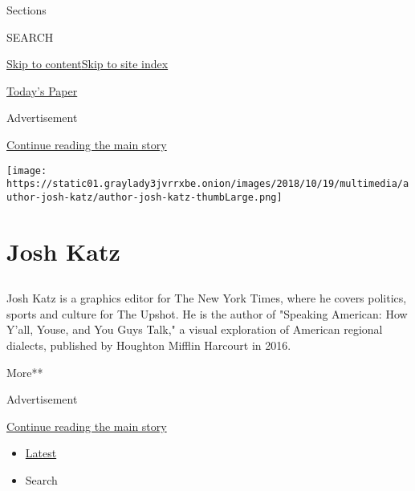 Sections

SEARCH

\protect\hyperlink{site-content}{Skip to
content}\protect\hyperlink{site-index}{Skip to site index}

\href{https://myaccount.nytimes3xbfgragh.onion/auth/login?response_type=cookie\&client_id=vi}{}

\href{https://www.nytimes3xbfgragh.onion/section/todayspaper}{Today's
Paper}

Advertisement

\protect\hyperlink{after-top}{Continue reading the main story}

\texttt{[image: https://static01.graylady3jvrrxbe.onion/images/2018/10/19/multimedia/author-josh-katz/author-josh-katz-thumbLarge.png]}

\hypertarget{josh-katz}{%
\section{Josh Katz}\label{josh-katz}}

\subsection{}

Josh Katz is a graphics editor for The New York Times, where he covers
politics, sports and culture for The Upshot. He is the author of
"Speaking American: How Y'all, Youse, and You Guys Talk," a visual
exploration of American regional dialects, published by Houghton Mifflin
Harcourt in 2016.

More**

Advertisement

\protect\hyperlink{after-mid1}{Continue reading the main story}

\begin{itemize}
\tightlist
\item
  \protect\hyperlink{stream-panel}{Latest}
\item
  Search
\end{itemize}

